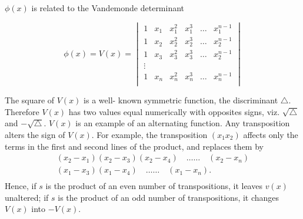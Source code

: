 $\phi(x)$ is related to the Vandemonde determinant

$$\phi(x) = V(x) =
\begin{vmatrix}
1 & x_1 & x_1^2 & x_1^3 & \hdots & x_1^{n-1} \\
1 & x_2 & x_2^2 & x_2^3 &\hdots &x_2^{n-1} \\
1 & x_3 & x_3^2 & x_3^3 &\hdots & x_2^{n-1} \\
\vdots \\
1 & x_n & x_n^2 & x_n^3 &\hdots & x_n^{n-1} \\
\end{vmatrix}
$$

The square of $V(x)$ is a
well- known symmetric function, the discriminant $\triangle$. Therefore $V(x)$ has two values equal
numerically with opposites signs, viz. $\sqrt{\triangle}$ and $-\sqrt{\triangle}$. $V(x)$ is an example
of an alternating function. Any transposition alters the sign of $V(x)$. For example, the transposition
$(x_1x_2)$ affects only the terms in the first and second lines of the product, and replaces them by
\[
\begin{array}{r}
(x_2-x_1) (x_2 - x_3) (x_2 - x_4) \quad \hdots\hdots\quad (x_2 - x_n) \\
(x_1-x_3) (x_1-x_4) \quad \hdots\hdots\quad (x_1 - x_n). \\
\end{array}
\]
Hence, if $s$ is the product of an even number of transpositions, it leaves $v(x)$ unaltered; if $s$
is the product of an odd number of transpositions, it changes $V(x)$ into $-V(x)$. \\